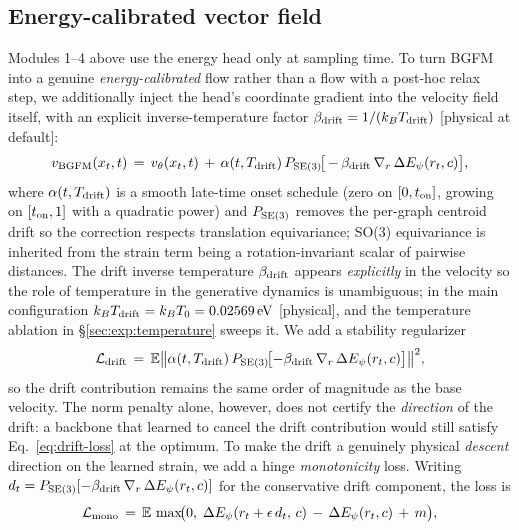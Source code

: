 \documentclass{article}
\begin{document}
\subsection{Energy-calibrated vector field}
\label{sec:method:drift}

Modules 1--4 above use the energy head only at sampling time. To turn
BGFM into a genuine \emph{energy-calibrated} flow rather than a flow
with a post-hoc relax step, we additionally inject the head's
coordinate gradient into the velocity field itself, with an explicit
inverse-temperature factor $\beta_{\rm drift} = 1/(k_B T_{\rm drift})$
[physical at default]:
\begin{equation}
    v_{\rm BGFM}(x_t, t) \,=\, v_\theta(x_t, t)
    \,+\, \alpha(t, T_{\rm drift})\,P_{\rm SE(3)}\!\bigl[\,-\,\beta_{\rm drift}\,\nabla_r\,\Delta E_\psi(r_t, c)\bigr],
    \label{eq:bgfm-velocity}
\end{equation}
where $\alpha(t, T_{\rm drift})$ is a smooth late-time onset schedule
(zero on $[0, t_{\rm on}]$, growing on $[t_{\rm on}, 1]$ with a quadratic
power) and $P_{\rm SE(3)}$ removes the per-graph centroid drift so the
correction respects translation equivariance; SO(3) equivariance is
inherited from the strain term being a rotation-invariant scalar of
pairwise distances. The drift inverse temperature $\beta_{\rm drift}$
appears \emph{explicitly} in the velocity so the role of temperature in
the generative dynamics is unambiguous; in the main configuration
$k_B T_{\rm drift} = k_B T_0 = 0.02569\,\mathrm{eV}$ [physical], and
the temperature ablation in \S\ref{sec:exp:temperature} sweeps it.
We add a stability regularizer
\begin{equation}
    \mathcal L_{\rm drift} \,=\, \mathbb E \bigl\|\alpha(t, T_{\rm drift})\,P_{\rm SE(3)}\!\bigl[-\beta_{\rm drift}\,\nabla_r\,\Delta E_\psi(r_t, c)\bigr]\bigr\|^2,
    \label{eq:drift-loss}
\end{equation}
so the drift contribution remains the same order of magnitude as the
base velocity. The norm penalty alone, however, does not certify the
\emph{direction} of the drift: a backbone that learned to cancel the
drift contribution would still satisfy Eq.~\eqref{eq:drift-loss} at the
optimum. To make the drift a genuinely physical \emph{descent} direction
on the learned strain, we add a hinge \emph{monotonicity} loss. Writing
$d_t = P_{\rm SE(3)}[-\beta_{\rm drift}\,\nabla_r\,\Delta E_\psi(r_t, c)]$
for the conservative drift component, the loss is
\begin{equation}
    \mathcal L_{\rm mono} \,=\, \mathbb E\,\max\!\bigl(0,\;
        \Delta E_\psi(r_t + \epsilon\,d_t,\,c)
        \,-\, \Delta E_\psi(r_t, c)
        \,+\, m\bigr),
    \label{eq:drift-monotonicity}
\end{equation}
\end{document}
